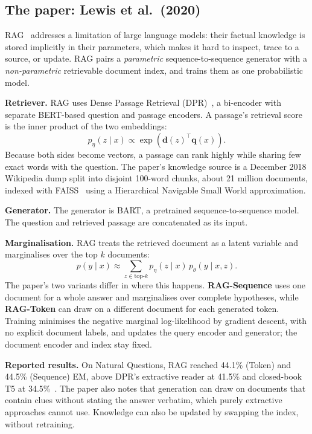 \documentclass[11pt,a4paper]{article}
\begin{document}
\subsection{The paper: Lewis et al.\ (2020)}
RAG~\cite{rag} addresses a limitation of large language models: their factual knowledge is stored implicitly in their parameters, which makes it hard to inspect, trace to a source, or update. RAG pairs a \emph{parametric} sequence-to-sequence generator with a \emph{non-parametric} retrievable document index, and trains them as one probabilistic model.

\textbf{Retriever.} RAG uses Dense Passage Retrieval (DPR)~\cite{dpr}, a bi-encoder with separate BERT-based question and passage encoders. A passage's retrieval score is the inner product of the two embeddings:
\begin{equation}
    p_\eta(z \mid x) \propto \exp\left(\mathbf{d}(z)^\top \mathbf{q}(x)\right).
\end{equation}
Because both sides become vectors, a passage can rank highly while sharing few exact words with the question. The paper's knowledge source is a December 2018 Wikipedia dump split into disjoint 100-word chunks, about 21 million documents, indexed with FAISS~\cite{faiss} using a Hierarchical Navigable Small World approximation.

\textbf{Generator.} The generator is BART, a pretrained sequence-to-sequence model. The question and retrieved passage are concatenated as its input.

\textbf{Marginalisation.} RAG treats the retrieved document as a latent variable and marginalises over the top $k$ documents:
\begin{equation}
    p(y \mid x) \approx \sum_{z \in \text{top-}k} p_\eta(z \mid x)\, p_\theta(y \mid x, z).
\end{equation}
The paper's two variants differ in where this happens. \textbf{RAG-Sequence} uses one document for a whole answer and marginalises over complete hypotheses, while \textbf{RAG-Token} can draw on a different document for each generated token. Training minimises the negative marginal log-likelihood by gradient descent, with no explicit document labels, and updates the query encoder and generator; the document encoder and index stay fixed.

\textbf{Reported results.} On Natural Questions, RAG reached 44.1\% (Token) and 44.5\% (Sequence) EM, above DPR's extractive reader at 41.5\% and closed-book T5 at 34.5\%~\cite{rag}. The paper also notes that generation can draw on documents that contain clues without stating the answer verbatim, which purely extractive approaches cannot use. Knowledge can also be updated by swapping the index, without retraining.
\end{document}
